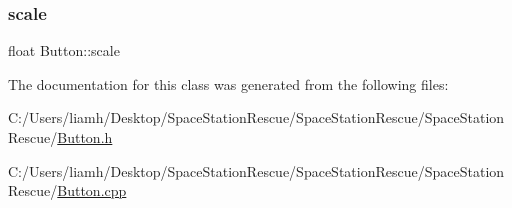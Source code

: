 \mbox{\label{class_button_acdb4c06383a37922c645c597f8597ab1}} 
\subsubsection{\texorpdfstring{scale}{scale}}
{\footnotesize\ttfamily float Button\+::scale\hspace{0.3cm}{\ttfamily [protected]}}



The documentation for this class was generated from the following files\+:\begin{DoxyCompactItemize}
\item 
C\+:/\+Users/liamh/\+Desktop/\+Space\+Station\+Rescue/\+Space\+Station\+Rescue/\+Space\+Station\+Rescue/\mbox{\hyperlink{_button_8h}{Button.\+h}}\item 
C\+:/\+Users/liamh/\+Desktop/\+Space\+Station\+Rescue/\+Space\+Station\+Rescue/\+Space\+Station\+Rescue/\mbox{\hyperlink{_button_8cpp}{Button.\+cpp}}\end{DoxyCompactItemize}
